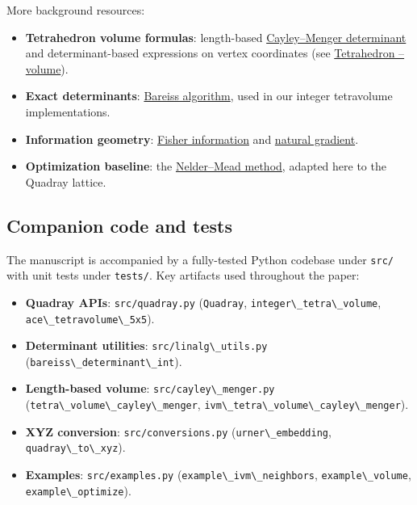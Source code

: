 \documentclass[
  10pt,
]{article}
\newcommand{\passthrough}[1]{#1}
\providecommand{\tightlist}{%
  \setlength{\itemsep}{0pt}\setlength{\parskip}{0pt}}
\begin{document}
More background resources:

\begin{itemize}
\tightlist
\item
  \textbf{Tetrahedron volume formulas}: length-based
  \href{https://en.wikipedia.org/wiki/Cayley\%E2\%80\%93Menger_determinant}{Cayley--Menger
  determinant} and determinant-based expressions on vertex coordinates
  (see
  \href{https://en.wikipedia.org/wiki/Tetrahedron\#Volume}{Tetrahedron
  -- volume}).
\item
  \textbf{Exact determinants}:
  \href{https://en.wikipedia.org/wiki/Bareiss_algorithm}{Bareiss
  algorithm}, used in our integer tetravolume implementations.
\item
  \textbf{Information geometry}:
  \href{https://en.wikipedia.org/wiki/Fisher_information}{Fisher
  information} and
  \href{https://en.wikipedia.org/wiki/Natural_gradient}{natural
  gradient}.
\item
  \textbf{Optimization baseline}: the
  \href{https://en.wikipedia.org/wiki/Nelder\%E2\%80\%93Mead_method}{Nelder--Mead
  method}, adapted here to the Quadray lattice.
\end{itemize}

\hypertarget{companion-code-and-tests}{%
\subsection{Companion code and tests}\label{companion-code-and-tests}}

The manuscript is accompanied by a fully-tested Python codebase under
\passthrough{\lstinline!src/!} with unit tests under
\passthrough{\lstinline!tests/!}. Key artifacts used throughout the
paper:

\begin{itemize}
\tightlist
\item
  \textbf{Quadray APIs}: \passthrough{\lstinline!src/quadray.py!}
  (\passthrough{\lstinline!Quadray!},
  \passthrough{\lstinline!integer\_tetra\_volume!},
  \passthrough{\lstinline!ace\_tetravolume\_5x5!}).
\item
  \textbf{Determinant utilities}:
  \passthrough{\lstinline!src/linalg\_utils.py!}
  (\passthrough{\lstinline!bareiss\_determinant\_int!}).
\item
  \textbf{Length-based volume}:
  \passthrough{\lstinline!src/cayley\_menger.py!}
  (\passthrough{\lstinline!tetra\_volume\_cayley\_menger!},
  \passthrough{\lstinline!ivm\_tetra\_volume\_cayley\_menger!}).
\item
  \textbf{XYZ conversion}: \passthrough{\lstinline!src/conversions.py!}
  (\passthrough{\lstinline!urner\_embedding!},
  \passthrough{\lstinline!quadray\_to\_xyz!}).
\item
  \textbf{Examples}: \passthrough{\lstinline!src/examples.py!}
  (\passthrough{\lstinline!example\_ivm\_neighbors!},
  \passthrough{\lstinline!example\_volume!},
  \passthrough{\lstinline!example\_optimize!}).
\end{itemize}
\end{document}
